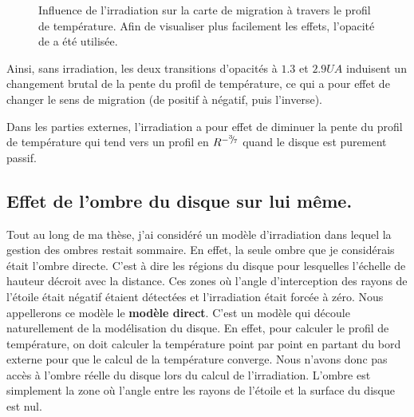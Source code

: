 \begin{figure}[htbp]
\centering
{}\hfill
{}

\caption{Influence de l'irradiation sur la carte de migration à travers le profil de température. Afin de visualiser plus
facilement les effets, l'opacité de \cite{bell1994FU} a été utilisée. }\label{fig:irradiation}
\end{figure}

Ainsi, sans irradiation, les deux transitions d'opacités à $1.3$ et $2.9\unit{UA}$ induisent un changement brutal de la pente
du profil de température, ce qui a pour effet de changer le sens de migration (de positif à négatif, puis l'inverse).

Dans les parties externes, l'irradiation a pour effet de diminuer la pente du profil de température qui tend vers un profil en
$R^{-{{}^{3\!\!}/ _{\!7}}}$ quand le disque est purement passif.


\subsection{Effet de l'ombre du disque sur lui même.}\label{sec:shadow}
Tout au long de ma thèse, j'ai considéré un modèle d'irradiation dans lequel la gestion des ombres restait sommaire. En effet, la seule ombre que je considérais était l'ombre directe. C'est à dire les régions du disque pour lesquelles l'échelle de hauteur décroit avec la distance. Ces zones où l'angle d'interception des rayons de l'étoile était négatif étaient détectées et l'irradiation était forcée à zéro. Nous appellerons ce modèle le \textbf{modèle direct}. C'est un modèle qui découle naturellement de la modélisation du disque. En effet, pour calculer le profil de température, on doit calculer la température point par point en partant du bord externe pour que le calcul de la température converge. Nous n'avons donc pas accès à l'ombre réelle du disque lors du calcul de l'irradiation. L'ombre est simplement la zone où l'angle entre les rayons de l'étoile et la surface du disque est nul.

